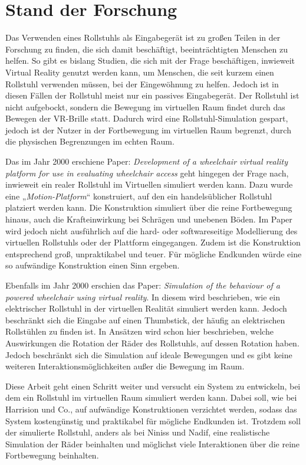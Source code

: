 \chapter{Stand der Forschung}
Das Verwenden eines Rollstuhls als Eingabegerät ist zu großen Teilen in der Forschung zu finden, die sich damit beschäftigt, beeinträchtigten Menschen zu helfen.
So gibt es bislang Studien, die sich mit der Frage beschäftigen, inwieweit Virtual Reality genutzt werden kann, um Menschen, die seit kurzem einen Rollstuhl verwenden müssen, bei der Eingewöhnung zu helfen\cite{arlatiVirtualRealitybasedWheelchair2020}.
Jedoch ist in diesen Fällen der Rollstuhl meist nur ein passives Eingabegerät.
Der Rollstuhl ist nicht aufgebockt, sondern die Bewegung im virtuellen Raum findet durch das Bewegen der VR-Brille statt.
Dadurch wird eine Rollstuhl-Simulation gespart, jedoch ist der Nutzer in der Fortbewegung im virtuellen Raum begrenzt, durch die physischen Begrenzungen im echten Raum.

Das im Jahr 2000 erschiene Paper: \textit{Development of a wheelchair virtual reality platform for use in evaluating wheelchair access} geht hingegen der Frage nach, inwieweit ein realer Rollstuhl im Virtuellen simuliert werden kann\cite{harrisionDevelopmentWheelchairVirtual2000}.
Dazu wurde eine „\textit{Motion-Platform}“ konstruiert, auf den ein handelsüblicher Rollstuhl platziert werden kann.
Die Konstruktion simuliert über die reine Fortbewegung hinaus, auch die Krafteinwirkung bei Schrägen und unebenen Böden.
Im Paper wird jedoch nicht ausführlich auf die hard- oder softwareseitige Modellierung des virtuellen Rollstuhls oder der Plattform eingegangen.
Zudem ist die Konstruktion entsprechend groß, unpraktikabel und teuer.
Für mögliche Endkunden würde eine so aufwändige Konstruktion einen Sinn ergeben.

Ebenfalls im Jahr 2000 erschien das Paper: \textit{Simulation of the behaviour of a powered wheelchair using virtual reality}\cite{ninissSimulationBehaviourPowered2000}.
In diesem wird beschrieben, wie ein elektrischer Rollstuhl in der virtuellen Realität simuliert werden kann.
Jedoch beschränkt sich die Eingabe auf einen Thumbstick, der häufig an elektrischen Rollstühlen zu finden ist.
In Ansätzen wird schon hier beschrieben, welche Auswirkungen die Rotation der Räder des Rollstuhls, auf dessen Rotation haben.
Jedoch beschränkt sich die Simulation auf ideale Bewegungen und es gibt keine weiteren Interaktionsmöglichkeiten außer die Bewegung im Raum.

Diese Arbeit geht einen Schritt weiter und versucht ein System zu entwickeln, bei dem ein Rollstuhl im virtuellen Raum simuliert werden kann.
Dabei soll, wie bei Harrision und Co., auf aufwändige Konstruktionen verzichtet werden, sodass das System kostengünstig und praktikabel für mögliche Endkunden ist.
Trotzdem soll der simulierte Rollstuhl, anders als bei Niniss und Nadif, eine realistische Simulation der Räder beinhalten und möglichst viele Interaktionen über die reine Fortbewegung beinhalten.